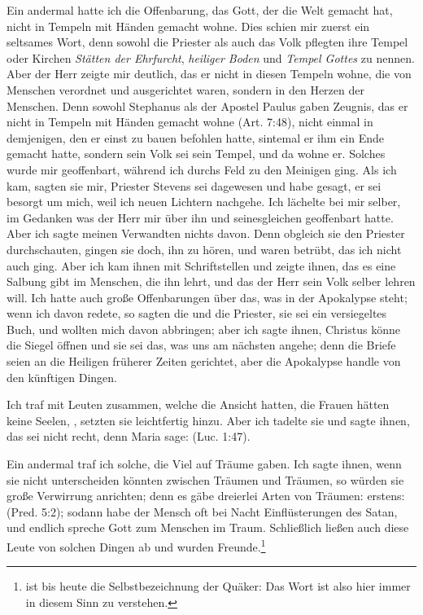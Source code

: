 Ein andermal hatte ich die Offenbarung, 
das Gott, der die
Welt gemacht hat, nicht in Tempeln mit Händen gemacht wohne.
Dies schien mir zuerst ein seltsames Wort, denn sowohl die
Priester als auch das Volk pflegten ihre Tempel oder Kirchen
\textit{Stätten der Ehrfurcht}, \textit{heiliger Boden} und \textit{Tempel Gottes}
zu nennen. Aber der Herr zeigte mir deutlich, das er nicht
in diesen Tempeln wohne, die von Menschen verordnet und
ausgerichtet waren, sondern in den Herzen der Menschen. Denn
sowohl Stephanus als der Apostel Paulus gaben Zeugnis,
das er nicht in Tempeln mit Händen gemacht wohne 
(Art. 7:48),
nicht einmal in demjenigen, den er einst zu bauen befohlen hatte,
sintemal er ihm ein Ende gemacht hatte, sondern sein Volk sei
sein Tempel, und da wohne er. Solches wurde mir geoffenbart,
während ich durchs Feld zu den Meinigen ging. Als ich kam,
sagten sie mir, Priester Stevens sei dagewesen und habe gesagt,
er sei besorgt um mich, weil ich neuen Lichtern nachgehe. Ich
lächelte bei mir selber, im Gedanken was der Herr mir über ihn
und seinesgleichen geoffenbart hatte. Aber ich sagte meinen 
Verwandten nichts davon. Denn obgleich sie den Priester durchschauten, 
gingen sie doch, ihn zu hören, und waren betrübt, das
ich nicht auch ging. Aber ich kam ihnen mit Schriftstellen und
zeigte ihnen, das es eine Salbung gibt im Menschen, die ihn
lehrt, und das der Herr sein Volk selber lehren will. Ich hatte
auch große Offenbarungen über das, was in der 
Apokalypse steht;
wenn ich davon redete, so sagten die  und die Priester,
sie sei ein versiegeltes Buch, und wollten mich davon abbringen;
aber ich sagte ihnen, Christus könne die Siegel öffnen und sie
sei das, was uns am nächsten angehe; denn die Briefe seien an
die Heiligen früherer Zeiten gerichtet, aber die Apokalypse handle
von den künftigen Dingen.

Ich traf mit Leuten zusammen, welche die Ansicht hatten,
die Frauen hätten keine Seelen, ,
setzten sie leichtfertig hinzu. Aber ich tadelte sie und sagte ihnen,
das sei nicht recht, denn Maria sage:  
(Luc. 1:47).

Ein andermal traf ich solche, die Viel auf Träume gaben.
Ich sagte ihnen, wenn sie nicht unterscheiden könnten zwischen
Träumen und Träumen, so würden sie große Verwirrung anrichten; 
denn es gäbe dreierlei Arten von Träumen: erstens:
(Pred. 5:2); sodann habe der
Mensch oft bei Nacht Einflüsterungen des Satan, 
und endlich
spreche Gott zum Menschen im Traum. Schließlich ließen auch
diese Leute von solchen Dingen ab und wurden Freunde.\footnote{ 
ist bis heute die Selbstbezeichnung der Quäker: Das Wort
 ist also hier immer in diesem Sinn zu verstehen.}


